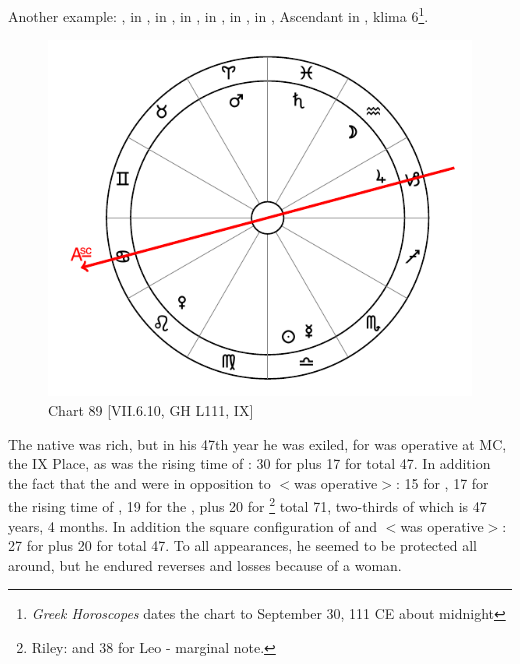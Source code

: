 Another example: \Sun, \Mercury\xspace in \Libra, \Moon\xspace in \Aquarius, \Saturn\xspace in \Pisces, \Jupiter\xspace in \Capricorn,
\Mars\xspace in \Aries, \Venus\xspace in \Leo, Ascendant in \Cancer, klima 6\footnote{\textit{Greek Horoscopes} dates the chart to September 30, 111 CE about midnight}.

\begin{figure}
\centering
\vspace{0pt}
\includegraphics[width=.68\textwidth]{charts/7_6_10}
\caption{Chart 89 [VII.6.10, GH L111, IX] }
\label{fig:chart89}
\end{figure} 

The native was rich, but in his 47th year he was exiled, for \Saturn\xspace was operative at MC, the IX Place, as was the rising time of \Pisces: 30 for \Saturn\xspace plus 17 for \Pisces\xspace total 47. In addition the fact that the \Sun\xspace and \Mercury\xspace were in opposition to \Mars\xspace $<$was operative$>$: 15 for \Mars, 17 for the rising time of \Aries, 19 for the \Sun, plus 20 for \Mercury\xspace\footnote{Riley: and 38 for Leo - marginal note.} total 71, two-thirds of which is 47 years, 4 months. In addition the square configuration of \Libra\xspace and \Capricorn\xspace $<$was operative$>$: 27 for \Capricorn\xspace plus 20 for \Libra\xspace total 47. To all appearances, he seemed to be protected all around, but he endured reverses and losses because of a woman.

